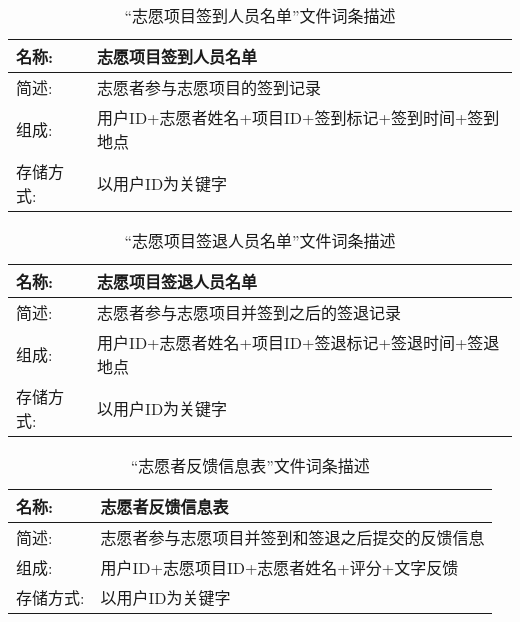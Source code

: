 \begin{table}[H]
  \begin{center}
    \caption{``志愿项目签到人员名单”文件词条描述}
    \begin{tabular}{l p{10cm}} 
      \hline
      名称: & 志愿项目签到人员名单\\
      \hline
      简述: &  志愿者参与志愿项目的签到记录\\
      \hline
      组成: &  用户ID+志愿者姓名+项目ID+签到标记+签到时间+签到地点\\
      \hline
      存储方式: &  以用户ID为关键字\\
      \hline
    \end{tabular}
    \label{志愿项目信息表}
  \end{center}
\end{table}

\begin{table}[H]
  \begin{center}
    \caption{``志愿项目签退人员名单”文件词条描述}
    \begin{tabular}{l p{10cm}} 
      \hline
      名称: & 志愿项目签退人员名单\\
      \hline
      简述: &  志愿者参与志愿项目并签到之后的签退记录\\
      \hline
      组成: &  用户ID+志愿者姓名+项目ID+签退标记+签退时间+签退地点\\
      \hline
      存储方式: &  以用户ID为关键字\\
      \hline
    \end{tabular}
    \label{志愿项目信息表}
  \end{center}
\end{table}


\begin{table}[H]
  \begin{center}
    \caption{``志愿者反馈信息表”文件词条描述}
    \begin{tabular}{l p{10cm}} 
      \hline
      名称: & 志愿者反馈信息表\\
      \hline
      简述: &  志愿者参与志愿项目并签到和签退之后提交的反馈信息\\
      \hline
      组成: &  用户ID+志愿项目ID+志愿者姓名+评分+文字反馈\\
      \hline
      存储方式: &  以用户ID为关键字\\
      \hline
    \end{tabular}
    \label{志愿项目信息表}
  \end{center}
\end{table}
